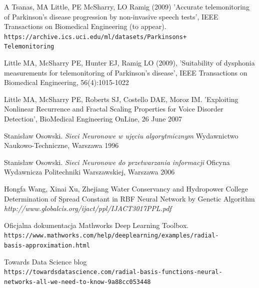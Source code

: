 \documentclass[12pt]{article}
\begin{document}
\newpage
\begin{thebibliography}{9}

A Tsanas, MA Little, PE McSharry, LO Ramig (2009) 
'Accurate telemonitoring of Parkinson’s disease progression by non-invasive speech tests', 
IEEE Transactions on Biomedical Engineering (to appear). 
\\\texttt{https://archive.ics.uci.edu/ml/datasets/Parkinsons+\\Telemonitoring}

Little MA, McSharry PE, Hunter EJ, Ramig LO (2009), 
'Suitability of dysphonia measurements for telemonitoring of Parkinson's disease', 
IEEE Transactions on Biomedical Engineering, 56(4):1015-1022 

Little MA, McSharry PE, Roberts SJ, Costello DAE, Moroz IM. 
'Exploiting Nonlinear Recurrence and Fractal Scaling Properties for Voice Disorder Detection', 
BioMedical Engineering OnLine, 26 June 2007

Stanisław Osowski.
\textit{Sieci Neuronowe w ujęciu algorytmicznym}
Wydawnictwo Naukowo-Techniczne, Warszawa 1996

Stanisław Osowski.
\textit{Sieci Neuronowe do przetwarzania informacji}
Oficyna Wydawnicza Politechniki Warszawskiej, Warszawa 2006

Hongfa Wang, Xinai Xu, Zhejiang
Water Conservancy and Hydropower College
Determination of Spread Constant in RBF Neural Network by Genetic
Algorithm 
\textit{http://www.globalcis.org/ijact/ppl/IJACT3017PPL.pdf}

Oficjalna dokumentacja Mathworks Deep Learning Toolbox. 
\\\texttt{https://www.mathworks.com/help/deeplearning/examples/radial-\\basis-approximation.html}

Towards Data Science blog
\\\texttt{https://towardsdatascience.com/radial-basis-functions-neural-\\networks-all-we-need-to-know-9a88cc053448}


\end{thebibliography}
\newpage

\listoffigures
\newpage
\end{document}
